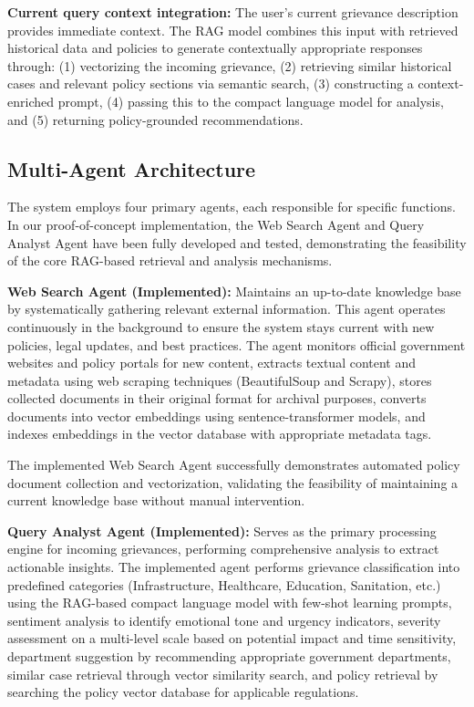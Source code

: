 \documentclass[conference]{IEEEtran}
\begin{document}
\textbf{Current query context integration:} The user's current grievance description provides immediate context. The RAG model combines this input with retrieved historical data and policies to generate contextually appropriate responses through: (1) vectorizing the incoming grievance, (2) retrieving similar historical cases and relevant policy sections via semantic search, (3) constructing a context-enriched prompt, (4) passing this to the compact language model for analysis, and (5) returning policy-grounded recommendations.

\subsection{Multi-Agent Architecture}

The system employs four primary agents, each responsible for specific functions. In our proof-of-concept implementation, the Web Search Agent and Query Analyst Agent have been fully developed and tested, demonstrating the feasibility of the core RAG-based retrieval and analysis mechanisms.

\textbf{Web Search Agent (Implemented):} Maintains an up-to-date knowledge base by systematically gathering relevant external information. This agent operates continuously in the background to ensure the system stays current with new policies, legal updates, and best practices. The agent monitors official government websites and policy portals for new content, extracts textual content and metadata using web scraping techniques (BeautifulSoup and Scrapy), stores collected documents in their original format for archival purposes, converts documents into vector embeddings using sentence-transformer models, and indexes embeddings in the vector database with appropriate metadata tags.

The implemented Web Search Agent successfully demonstrates automated policy document collection and vectorization, validating the feasibility of maintaining a current knowledge base without manual intervention.

\textbf{Query Analyst Agent (Implemented):} Serves as the primary processing engine for incoming grievances, performing comprehensive analysis to extract actionable insights. The implemented agent performs grievance classification into predefined categories (Infrastructure, Healthcare, Education, Sanitation, etc.) using the RAG-based compact language model with few-shot learning prompts, sentiment analysis to identify emotional tone and urgency indicators, severity assessment on a multi-level scale based on potential impact and time sensitivity, department suggestion by recommending appropriate government departments, similar case retrieval through vector similarity search, and policy retrieval by searching the policy vector database for applicable regulations.
\end{document}
